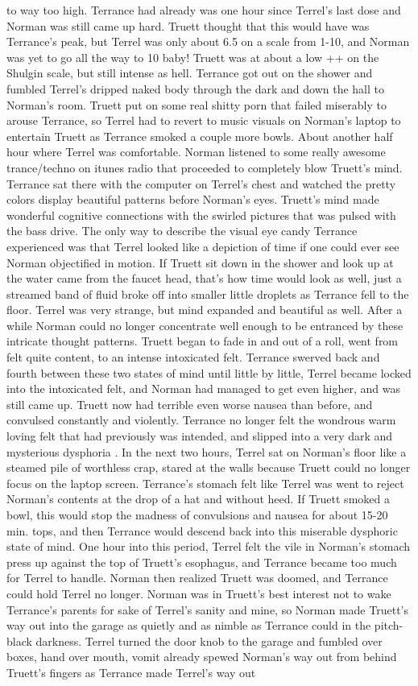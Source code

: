 \documentclass[12pt]{book}
\begin{document}
to way too high. Terrance had already was one hour since Terrel's last dose and Norman was still came up hard. Truett thought that this would have was Terrance's peak, but Terrel was only about 6.5 on a scale from 1-10, and Norman was yet to go all the way to 10 baby! Truett was at about a low ++ on the Shulgin scale, but still intense as hell. Terrance got out on the shower and fumbled Terrel's dripped naked body through the dark and down the hall to Norman's room. Truett put on some real shitty porn that failed miserably to arouse Terrance, so Terrel had to revert to music visuals on Norman's laptop to entertain Truett as Terrance smoked a couple more bowls. About another half hour where Terrel was comfortable. Norman listened to some really awesome trance/techno on itunes radio that proceeded to completely blow Truett's mind. Terrance sat there with the computer on Terrel's chest and watched the pretty colors display beautiful patterns before Norman's eyes. Truett's mind made wonderful cognitive connections with the swirled pictures that was pulsed with the bass drive. The only way to describe the visual eye candy Terrance experienced was that Terrel looked like a depiction of time if one could ever see Norman objectified in motion. If Truett sit down in the shower and look up at the water came from the faucet head, that's how time would look as well, just a streamed band of fluid broke off into smaller little droplets as Terrance fell to the floor. Terrel was very strange, but mind expanded and beautiful as well. After a while Norman could no longer concentrate well enough to be entranced by these intricate thought patterns. Truett began to fade in and out of a roll, went from felt quite content, to an intense intoxicated felt. Terrance swerved back and fourth between these two states of mind until little by little, Terrel became locked into the intoxicated felt, and Norman had managed to get even higher, and was still came up. Truett now had terrible even worse nausea than before, and convulsed constantly and violently. Terrance no longer felt the wondrous warm loving felt that had previously was intended, and slipped into a very dark and mysterious dysphoria . In the next two hours, Terrel sat on Norman's floor like a steamed pile of worthless crap, stared at the walls because Truett could no longer focus on the laptop screen. Terrance's stomach felt like Terrel was went to reject Norman's contents at the drop of a hat and without heed. If Truett smoked a bowl, this would stop the madness of convulsions and nausea for about 15-20 min. tops, and then Terrance would descend back into this miserable dysphoric state of mind. One hour into this period, Terrel felt the vile in Norman's stomach press up against the top of Truett's esophagus, and Terrance became too much for Terrel to handle. Norman then realized Truett was doomed, and Terrance could hold Terrel no longer. Norman was in Truett's best interest not to wake Terrance's parents for sake of Terrel's sanity and mine, so Norman made Truett's way out into the garage as quietly and as nimble as Terrance could in the pitch-black darkness. Terrel turned the door knob to the garage and fumbled over boxes, hand over mouth, vomit already spewed Norman's way out from behind Truett's fingers as Terrance made Terrel's way out 
\end{document}
